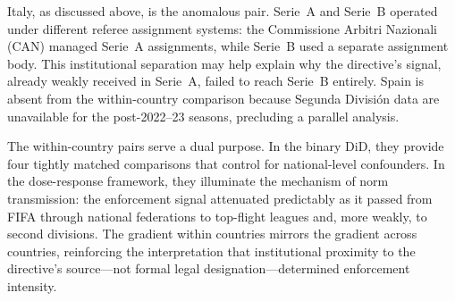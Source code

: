 Italy, as discussed above, is the anomalous pair. Serie~A and Serie~B
operated under different referee assignment systems: the Commissione
Arbitri Nazionali (CAN) managed Serie~A assignments, while Serie~B
used a separate assignment body. This institutional separation may help
explain why the directive's signal, already weakly received in Serie~A,
failed to reach Serie~B entirely. Spain is absent from the within-country
comparison because Segunda Divisi\'{o}n data are unavailable for the
post-2022--23 seasons, precluding a parallel analysis.

The within-country pairs serve a dual purpose. In the binary DiD, they
provide four tightly matched comparisons that control for national-level
confounders. In the dose-response framework, they illuminate the
mechanism of norm transmission: the enforcement signal attenuated
predictably as it passed from FIFA through national federations to
top-flight leagues and, more weakly, to second divisions. The
gradient within countries mirrors the gradient across countries,
reinforcing the interpretation that institutional proximity to the
directive's source---not formal legal designation---determined
enforcement intensity.

